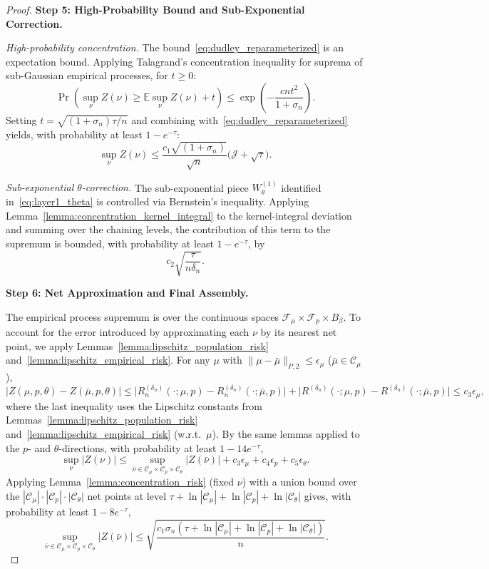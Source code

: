 \begin{proof}
\noindent\textbf{Step 5: High-Probability Bound and Sub-Exponential Correction.}

\noindent\textit{High-probability concentration.}
The bound~\eqref{eq:dudley_reparameterized} is an expectation bound. Applying Talagrand's concentration inequality for suprema of sub-Gaussian empirical processes, for $t\geq 0$:
$$\Pr\!\left(\sup_\nu Z(\nu) \geq \mathbb{E}\!\sup_\nu Z(\nu) + t\right) \leq \exp\!\left(-\frac{cnt^2}{1+\sigma_n}\right).$$
Setting $t=\sqrt{(1+\sigma_n)\tau/n}$ and combining with~\eqref{eq:dudley_reparameterized} yields, with probability at least $1-e^{-\tau}$:
\begin{equation}\label{eq:hp_main}
\sup_\nu Z(\nu) \leq \frac{c_1\sqrt{(1+\sigma_n)}}{\sqrt{n}}\bigl(\mathcal{J}+\sqrt{\tau}\bigr).
\end{equation}

\noindent\textit{Sub-exponential $\theta$-correction.}
The sub-exponential piece $W^{(1)}_\theta$ identified in~\eqref{eq:layer1_theta} is controlled via Bernstein's inequality. Applying Lemma~\ref{lemma:concentration_kernel_integral} to the kernel-integral deviation and summing over the chaining levels, the contribution of this term to the supremum is bounded, with probability at least $1-e^{-\tau}$, by
\begin{equation}\label{eq:bernstein_correction}
c_2\sqrt{\frac{\tau}{n\delta_n}}.
\end{equation}

\noindent\textbf{Step 6: Net Approximation and Final Assembly.}

The empirical process supremum is over the continuous spaces $\mathcal{F}_\mu\times\mathcal{F}_p\times B_\beta$. To account for the error introduced by approximating each $\nu$ by its nearest net point, we apply Lemmas~\ref{lemma:lipschitz_population_risk} and~\ref{lemma:lipschitz_empirical_risk}. For any $\mu$ with $\|\mu-\bar\mu\|_{P,2}\leq\epsilon_\mu$ ($\bar\mu\in\mathcal{C}_\mu$),
$$|Z(\mu,p,\theta)-Z(\bar\mu,p,\theta)| \leq \bigl|R_n^{(\delta_n)}(\cdot;\mu,p)-R_n^{(\delta_n)}(\cdot;\bar\mu,p)\bigr|+\bigl|R^{(\delta_n)}(\cdot;\mu,p)-R^{(\delta_n)}(\cdot;\bar\mu,p)\bigr| \leq c_3\epsilon_\mu,$$
where the last inequality uses the Lipschitz constants from Lemmas~\ref{lemma:lipschitz_population_risk} and~\ref{lemma:lipschitz_empirical_risk} (w.r.t.\ $\mu$). By the same lemmas applied to the $p$- and $\theta$-directions, with probability at least $1-14e^{-\tau}$,
$$\sup_{\nu}|Z(\nu)| \leq \sup_{\bar\nu\in\mathcal{C}_\mu\times\mathcal{C}_p\times\mathcal{C}_\theta}|Z(\bar\nu)| + c_3\epsilon_\mu + c_4\epsilon_p + c_5\epsilon_\theta.$$
Applying Lemma~\ref{lemma:concentration_risk} (fixed $\nu$) with a union bound over the $|\mathcal{C}_\mu|\cdot|\mathcal{C}_p|\cdot|\mathcal{C}_\theta|$ net points at level $\tau+\ln|\mathcal{C}_\mu|+\ln|\mathcal{C}_p|+\ln|\mathcal{C}_\theta|$ gives, with probability at least $1-8e^{-\tau}$,
$$\sup_{\bar\nu\in\mathcal{C}_\mu\times\mathcal{C}_p\times\mathcal{C}_\theta}|Z(\bar\nu)|\leq\sqrt{\frac{c_1\sigma_n(\tau+\ln|\mathcal{C}_\mu|+\ln|\mathcal{C}_p|+\ln|\mathcal{C}_\theta|)}{n}}.$$


\end{proof}

